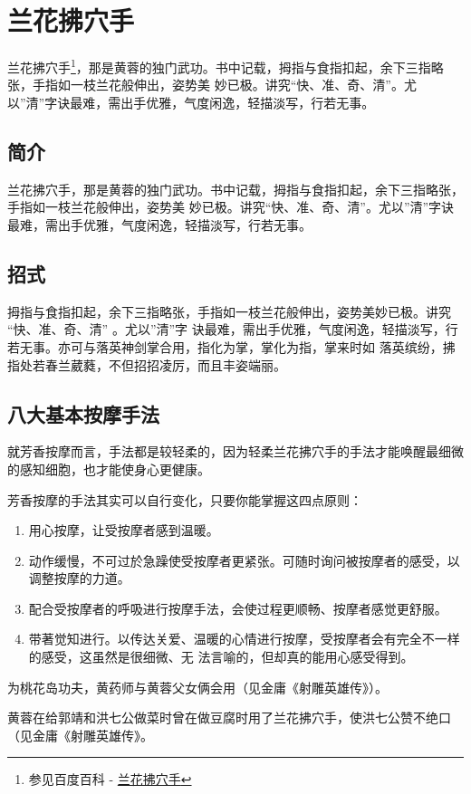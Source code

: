 \chapter{兰花拂穴手}
兰花拂穴手\footnote{参见百度百科 - \href{http://baike.baidu.com/view/1222399.htm?func=retitle\#sub1222399}{兰花拂穴手}}，那是黄蓉的独门武功。书中记载，拇指与食指扣起，余下三指略张，手指如一枝兰花般伸出，姿势美
妙已极。讲究“快、准、奇、清”。尤以”清”字诀最难，需出手优雅，气度闲逸，轻描淡写，行若无事。

\section{简介}
兰花拂穴手，那是黄蓉的独门武功。书中记载，拇指与食指扣起，余下三指略张，手指如一枝兰花般伸出，姿势美
妙已极。讲究“快、准、奇、清”。尤以”清”字诀最难，需出手优雅，气度闲逸，轻描淡写，行若无事。

\section{招式}
拇指与食指扣起，余下三指略张，手指如一枝兰花般伸出，姿势美妙已极。讲究 “快、准、奇、清” 。尤以”清”字
诀最难，需出手优雅，气度闲逸，轻描淡写，行若无事。亦可与落英神剑掌合用，指化为掌，掌化为指，掌来时如
落英缤纷，拂指处若春兰葳蕤，不但招招凌厉，而且丰姿端丽。

\section{八大基本按摩手法}
就芳香按摩而言，手法都是较轻柔的，因为轻柔兰花拂穴手的手法才能唤醒最细微的感知细胞，也才能使身心更健康。

芳香按摩的手法其实可以自行变化，只要你能掌握这四点原则：
\begin{enumerate}
\item 用心按摩，让受按摩者感到温暖。
\item 动作缓慢，不可过於急躁使受按摩者更紧张。可随时询问被按摩者的感受，以调整按摩的力道。
\item 配合受按摩者的呼吸进行按摩手法，会使过程更顺畅、按摩者感觉更舒服。
\item 带著觉知进行。以传达关爱、温暖的心情进行按摩，受按摩者会有完全不一样的感受，这虽然是很细微、无
  法言喻的，但却真的能用心感受得到。 
\end{enumerate}
为桃花岛功夫，黄药师与黄蓉父女俩会用（见金庸《射雕英雄传》）。

黄蓉在给郭靖和洪七公做菜时曾在做豆腐时用了兰花拂穴手，使洪七公赞不绝口（见金庸《射雕英雄传》。

